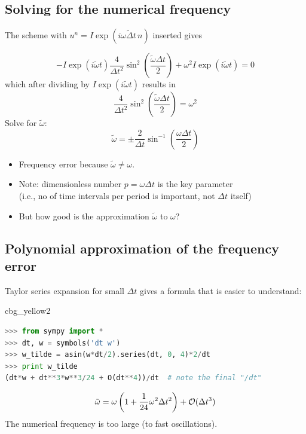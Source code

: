 \documentclass[%
oneside,                 %
final,                   %
10pt]{article}
\newenvironment{_cod_tight}[1]{
   \def\FrameCommand{\colorbox{#1}}
   \FrameRule0.6pt\MakeFramed {\FrameRestore}\vskip3mm}
   {\vskip0mm\endMakeFramed}
\newenvironment{cod}[1]{
\bgroup\rmfamily
\fboxsep=0mm\relax
\begin{_cod_tight}{#1}
\list{}{\parsep=-2mm\parskip=0mm\topsep=0pt\leftmargin=2mm
\rightmargin=2\leftmargin\leftmargin=4pt\relax}
\item\relax}
{\endlist\end{_cod_tight}\egroup}
\begin{document}
\subsection*{Solving for the numerical frequency}

The scheme
with $u^n=I\exp{(i\omega\tilde\Delta t\, n)}$ inserted gives

\[
-I\exp{(i\tilde\omega t)}\frac{4}{\Delta t^2}\sin^2(\frac{\tilde\omega\Delta t}{2})
+ \omega^2 I\exp{(i\tilde\omega t)} = 0
\]
which after dividing by $I\exp{(i\tilde\omega t)}$ results in
\[
\frac{4}{\Delta t^2}\sin^2(\frac{\tilde\omega\Delta t}{2}) = \omega^2
\]
Solve for $\tilde\omega$:
\[
\tilde\omega = \pm \frac{2}{\Delta t}\sin^{-1}\left(\frac{\omega\Delta t}{2}\right)
\]

\begin{itemize}
 \item Frequency error because $\tilde\omega \neq \omega$.

 \item Note: dimensionless number $p=\omega\Delta t$ is the key parameter \\
   (i.e., no of time intervals per period is important, not $\Delta t$ itself)

 \item But how good is the approximation $\tilde\omega$ to $\omega$?
\end{itemize}

\noindent
\subsection*{Polynomial approximation of the frequency error}

Taylor series expansion
for small $\Delta t$ gives a formula that is easier to understand:

\begin{cod}{cbg_yellow2}\begin{lstlisting}[language=Python,style=simple,xleftmargin=2mm]
>>> from sympy import *
>>> dt, w = symbols('dt w')
>>> w_tilde = asin(w*dt/2).series(dt, 0, 4)*2/dt
>>> print w_tilde
(dt*w + dt**3*w**3/24 + O(dt**4))/dt  # note the final "/dt"
\end{lstlisting}\end{cod}
\noindent

\[
\tilde\omega = \omega\left( 1 + \frac{1}{24}\omega^2\Delta t^2\right) + {\cal O}(\Delta t^3)
\]
The numerical frequency is too large (to fast oscillations).

\end{document}
